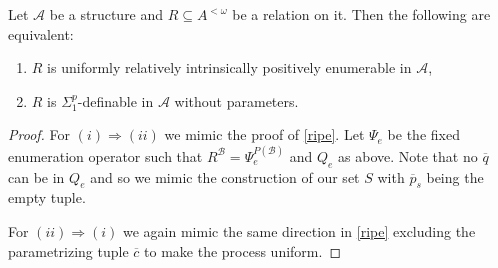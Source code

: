 \documentclass[11pt]{amsart}
\providecommand{\tightlist}{%
  \setlength{\itemsep}{0 pt}\setlength{\parskip}{0 pt}}
\newcommand{\A}{{\mathcal{A}}}
\newcommand{\B}{{\mathcal{B}}}
\renewcommand{\bar}[1]{\overline{#1}}
\begin{document}
\begin{cor}\label{uripe}
    Let $\A$ be a structure and $R \subseteq A^{< \omega}$ be a relation on it. Then the following are equivalent:
    \begin{enumerate}\tightlist
        \item[(i)] $R$ is uniformly relatively intrinsically positively enumerable in $\A$,
        \item[(ii)] $R$ is $\Sigma_1^p$-definable in $\A$ without parameters. 
    \end{enumerate}
\end{cor}
\begin{proof}
    For $(i) \Rightarrow (ii)$ we mimic the proof of \cref{ripe}. Let $\Psi_e$ be the fixed enumeration operator such that $R^{\B} = \Psi_e^{P(\B)}$ and $Q_e$ as above. Note that no $\bar q$ can be in $Q_e$ and so we mimic the construction of our set $S$ with $\bar p_s$ being the empty tuple.
    
    For $(ii) \Rightarrow (i)$ we again mimic the same direction in \cref{ripe} excluding the parametrizing tuple $\bar c$ to make the process uniform.
\end{proof}
\end{document}
